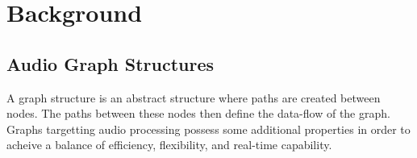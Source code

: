 \documentclass[twoside,a4paper]{article}
\begin{document}
%


%
%
%
%






\section{Background} %

\subsection{Audio Graph Structures} %

A graph structure is an abstract structure where paths are created between nodes.  The paths between these nodes then define the data-flow of the graph.  Graphs targetting audio processing possess some additional properties in order to acheive a balance of efficiency, flexibility, and real-time capability.
\end{document}

